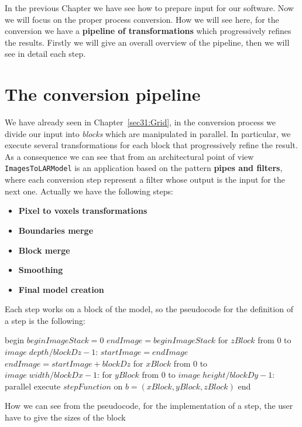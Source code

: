 In the previous Chapter we have see how to prepare input for our software. Now we will focus on the proper process conversion. How we will see here, for the conversion we have a \textbf{pipeline of transformations} which progressively refines the results. Firstly we will give an overall overview of the pipeline, then we will see in detail each step.

\section{The conversion pipeline}\label{sec33:Pipeline}

We have already seen in Chapter~\ref{sec31:Grid}, in the conversion process we divide our input into \textit{blocks} which are manipulated in parallel. In particular, we execute several transformations for each block that progressively refine the result. As a consequence we can see that from an architectural point of view \texttt{ImagesToLARModel} is an application based on the pattern \textbf{pipes and filters}, where each conversion step represent a filter whose output is the input for the next one. Actually we have the following steps:
\begin{itemize}
 \item \textbf{Pixel to voxels transformations}
 \item \textbf{Boundaries merge}
 \item \textbf{Block merge}
 \item \textbf{Smoothing}
 \item \textbf{Final model creation}
\end{itemize}

Each step works on a block of the model, so the pseudocode for the definition of a step is the following:

\begin{pseudo}[caption={Single step of the conversion pipeline}, label={lst:stepInvocation}]
begin
  $beginImageStack = 0$
  $endImage = beginImageStack$
  for $zBlock$ from $0$ to $image\; depth / blockDz - 1$:
    $startImage = endImage$
    $endImage = startImage + blockDz$
    for $xBlock$ from $0$ to $image\; width / blockDx - 1$:
      for $yBlock$ from $0$ to $image\; height / blockDy - 1$:
        parallel execute $stepFunction$ on $b=(xBlock,yBlock,zBlock)$
end       
\end{pseudo}

How we can see from the pseudocode, for the implementation of a step, the user have to give the sizes of the block

